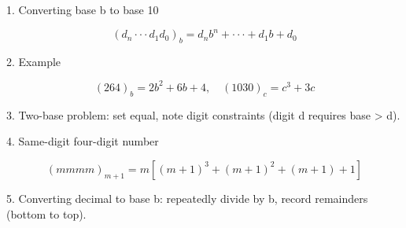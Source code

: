 1. Converting base b to base 10

$$ (d_n \cdot\cdot\cdot d_1 d_0)_b = d_n b^n + \cdot\cdot\cdot + d_1 b + d_0 $$

2. Example

$$ (264)_b = 2b^2+6b+4, \quad (1030)_c = c^3+3c $$

3. Two-base problem: set equal, note digit constraints (digit d requires base > d).

4. Same-digit four-digit number

$$ (mmmm)_{m+1} = m\left[(m+1)^3+(m+1)^2+(m+1)+1\right] $$

5. Converting decimal to base b: repeatedly divide by b, record remainders (bottom to top).
